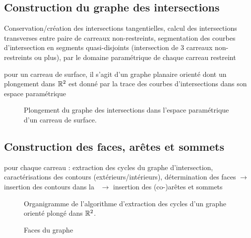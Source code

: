 \subsection{Construction du graphe des intersections}
Conservation/création des intersections tangentielles, calcul des intersections transverses entre paire de carreaux non-restreints, segmentation des courbes d'intersection en segments quasi-disjoints (intersection de 3 carreaux non-restreints ou plus),  par le domaine paramétrique de chaque carreau restreint
\par\bigskip
pour un carreau de surface, il s'agit d'un graphe planaire orienté dont un plongement dans $\mathbb{R}^2$ est donné par la trace des courbes d'intersections dans son espace paramétrique

\begin{figure}
	\centering
	\caption{Plongement du graphe des intersections dans l'espace paramétrique d'un carreau de surface.}
\end{figure}


\subsection{Construction des faces, arêtes et sommets \brep}
pour chaque carreau : extraction des cycles du graphe d'intersection, caractérisations des contours (extérieurs/intérieurs), détermination des faces $\to$ insertion des contours dans la \brep\ $\to$ insertion des (co-)arêtes et sommets
\begin{figure}
	\centering
	
	\caption{Organigramme de l'algorithme d'extraction des cycles d'un graphe orienté plongé dans $\mathbb{R}^2$.}
\end{figure}


\begin{figure}
	\centering
	
	\caption{Faces du graphe}
\end{figure}